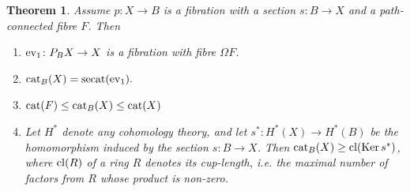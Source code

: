 \documentclass[11pt]{amsart}
\theoremstyle{plain}
\newtheorem{theorem}{Theorem}[section]
\theoremstyle{definition}
\newcommand{\Ker}{\mathop{\rm Ker}\nolimits}
\newcommand{\cl}{\mathop{\rm cl}\nolimits}
\newcommand{\ev}{\mathop{\rm ev}\nolimits}
\newcommand{\cat}{\mathop{\rm cat}\nolimits}
\newcommand{\secat}{\mathop{\rm secat}\nolimits}
\begin{document}
\begin{theorem}\label{thm:catB(X)}
Assume $p\colon X\to B$ is a fibration with a section $s\colon B\to X$ and a path-connected fibre $F$.
Then
\begin{enumerate}[wide, labelwidth=!]
\item $\ev_1\colon P_BX\to X$ is a fibration with fibre $\Omega F$.

\item $\cat_B(X)=\secat(\ev_1).$

\item $\cat(F)\le\cat_B(X)\le \cat(X)$

\item Let $H^*$ denote any cohomology theory, and let $s^*\colon H^*(X)\to H^*(B)$ be the 
homomorphism induced by the section $s\colon B\to X$. Then  
$\cat_B(X)\ge \cl(\Ker s^*)$, 
where $\cl(R)$ of a ring $R$ denotes its cup-length, i.e. the maximal number of factors from $R$
whose product is non-zero.
\end{enumerate}
\end{theorem}
\end{document}
